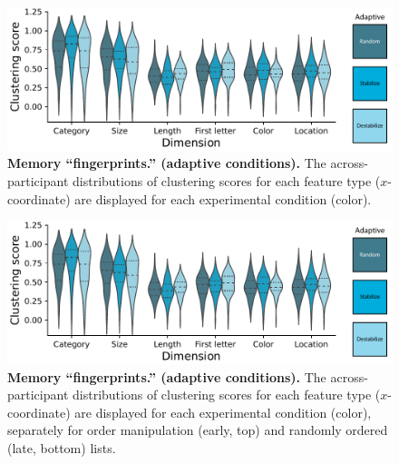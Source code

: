 \documentclass{article}
\begin{document}
\begin{figure}[tp] \centering
    \includegraphics[width=\textwidth]{figures/fingerprints_adaptive}
    
    \caption{\textbf{Memory ``fingerprints.'' (adaptive conditions).}
    The across-participant distributions of clustering scores for each feature
    type ($x$-coordinate) are displayed for each experimental condition
    (color).}
        \label{fig:fingerprints-adaptive}
\end{figure}

\begin{figure}[tp] \centering
    \includegraphics[width=\textwidth]{figures/fingerprints_adaptive}
    
    \caption{\textbf{Memory ``fingerprints.'' (adaptive conditions).}
    The across-participant distributions of clustering scores for each feature
    type ($x$-coordinate) are displayed for each experimental condition
    (color), separately for order manipulation (early, top) and randomly
    ordered (late, bottom) lists.}
        \label{fig:fingerprints-adaptive}
\end{figure}
\end{document}
